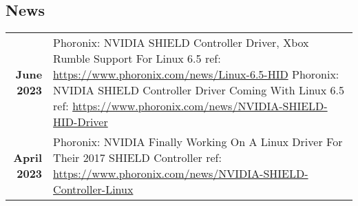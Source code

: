 \documentclass[lighthipster]{simplehipstercv}
\begin{document}
\begin{paracol}{2}
\section*{News}
\begin{tabular}{>{\footnotesize\bfseries}r >{\footnotesize}p{}}
    June 2023 & Phoronix: NVIDIA SHIELD Controller Driver, Xbox Rumble Support For Linux 6.5 \newline ref: \href{https://www.phoronix.com/news/Linux-6.5-HID}{https://www.phoronix.com/news/Linux-6.5-HID} \newline
                Phoronix: NVIDIA SHIELD Controller Driver Coming With Linux 6.5 \newline ref: \href{https://www.phoronix.com/news/NVIDIA-SHIELD-HID-Driver}{https://www.phoronix.com/news/NVIDIA-SHIELD-HID-Driver} \\
    April 2023 & Phoronix: NVIDIA Finally Working On A Linux Driver For Their 2017 SHIELD Controller \newline ref: \href{https://www.phoronix.com/news/NVIDIA-SHIELD-Controller-Linux}{https://www.phoronix.com/news/NVIDIA-SHIELD-Controller-Linux}
\end{tabular}
\bigskip

\begin{comment}
\section*{Languages}
\begin{tabular}{l | ll}
\textbf{English} & C2 & {\phantom{x}\footnotesize mother tongue} \\
\textbf{Japanese} & A1 & \pictofraction{\faCircle}{cvred}{1}{black!30}{3}{\tiny}
\end{tabular}
\end{comment}
\bigskip

\hfill
\begin{minipage}[t]{0.3\textwidth}
\begin{comment}
\section*{Publications}
\begin{tabular}{>{\footnotesize\bfseries}r >{\footnotesize}p{0.7\textwidth}}
    1729 & \emph{How I almost got killed by Lady Swan}, Tortuga Printing Press. \\
    1720 & ``Privateering for Beginners'', in: \emph{The Pragmatic Pirate} (1/1720).
\end{tabular}
\end{comment}
\bigskip
\begin{comment}

\end{comment}
\end{minipage}
\end{paracol}
\end{document}
